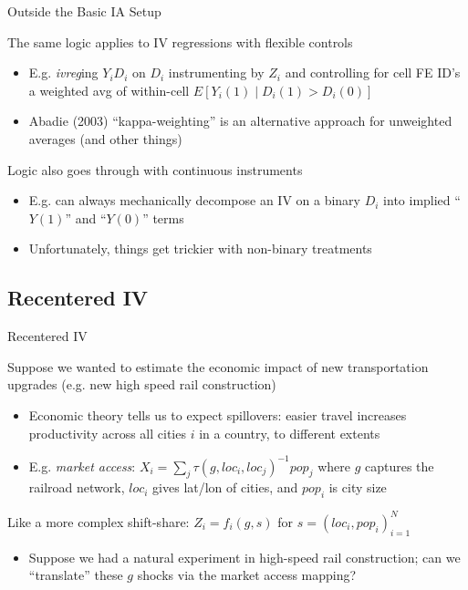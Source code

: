 \documentclass{beamer}
\begin{document}
\begin{frame}{Outside the Basic IA Setup}

The same logic applies to IV regressions with flexible controls \smallskip
\begin{itemize}
\item E.g. \emph{ivreg}ing $Y_iD_i$ on $D_i$ instrumenting by $Z_i$ and controlling for cell FE ID's a weighted avg of within-cell $E[Y_i(1)\mid D_i(1)>D_i(0)]$\smallskip\pause{}
\item Abadie (2003) ``kappa-weighting'' is an alternative approach for unweighted averages (and other things)
\end{itemize}\bigskip\pause{}

Logic also goes through with continuous instruments\smallskip
\begin{itemize}
\item E.g. can always mechanically decompose an IV on a binary $D_i$ into implied ``$Y(1)$'' and ``$Y(0)$'' terms
\item Unfortunately, things get trickier with non-binary treatments
\end{itemize}

\end{frame}


\subsection{Recentered IV}
\begin{frame}{Recentered IV}

Suppose we wanted to estimate the economic impact of new transportation upgrades (e.g. new high speed rail construction)
\begin{itemize}
\item Economic theory tells us to expect spillovers: easier travel increases productivity across all cities $i$ in a country, to different extents
\item E.g. \emph{market access}: $X_i=\sum_j \tau(g,loc_i,loc_j)^{-1}pop_j$ where $g$ captures the railroad network, $loc_i$ gives lat/lon of cities, and $pop_i$ is city size
\end{itemize}\bigskip\pause{}

Like a more complex shift-share: $Z_i=f_i(g,s)$ for $s=(loc_i,pop_i)_{i=1}^{N}$
\begin{itemize}
\item Suppose we had a natural experiment in high-speed rail construction; can we ``translate'' these $g$ shocks via the market access mapping?
\end{itemize}
\end{frame}
\end{document}
